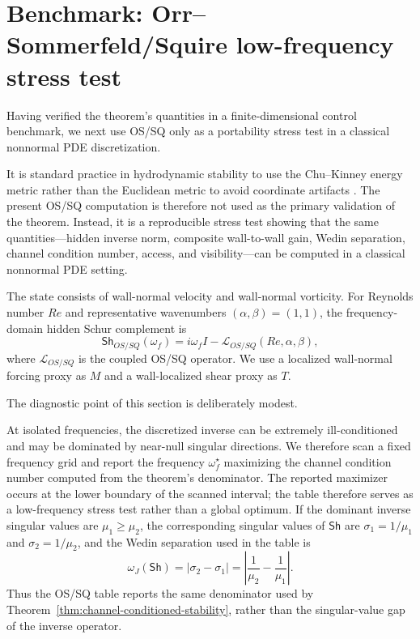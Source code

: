 \documentclass[review]{siamart220329}
\theoremstyle{definition}
\theoremstyle{remark}
\newcommand{\Sh}{\mathsf{Sh}}
\begin{document}
\section{Benchmark: Orr--Sommerfeld/Squire low-frequency stress test}\label{sec:orr-sommerfeld}

Having verified the theorem's quantities in a finite-dimensional control benchmark, we next use OS/SQ only as a portability stress test in a classical nonnormal PDE discretization.

It is standard practice in hydrodynamic stability to use the Chu--Kinney
energy metric rather than the Euclidean metric to avoid coordinate artifacts
\cite{SchmidHenningson2001}. The present OS/SQ computation is therefore not
used as the primary validation of the theorem. Instead, it is a reproducible
stress test showing that the same quantities---hidden inverse norm, composite
wall-to-wall gain, Wedin separation, channel condition number, access, and
visibility---can be computed in a classical nonnormal PDE setting.

The state consists of wall-normal velocity and wall-normal vorticity. For
Reynolds number $Re$ and representative wavenumbers $(\alpha,\beta)=(1,1)$, the
frequency-domain hidden Schur complement is
\begin{equation}
    \Sh_{OS/SQ}(\omega_f)=i\omega_f I-\mathcal L_{OS/SQ}(Re,\alpha,\beta),
    \label{eq:orr-sommerfeld-schur}
\end{equation}
where $\mathcal L_{OS/SQ}$ is the coupled OS/SQ operator. We use a localized
wall-normal forcing proxy as $M$ and a wall-localized shear proxy as $T$.

The diagnostic point of this section is deliberately modest.

At isolated
frequencies, the discretized inverse can be extremely ill-conditioned and may be
dominated by near-null singular directions. We therefore scan a fixed frequency
grid and report the frequency $\omega_f^\star$ maximizing the channel condition
number computed from the theorem's denominator. The reported maximizer occurs at the lower boundary of the scanned interval; the table therefore serves as a low-frequency stress test rather than a global optimum. If the dominant inverse singular
values are $\mu_1\geq\mu_2$, the corresponding singular values of $\Sh$ are
$\sigma_1=1/\mu_1$ and $\sigma_2=1/\mu_2$, and the Wedin separation used in the
table is
\begin{equation}
    \omega_J(\Sh)=|\sigma_2-\sigma_1|
    =\left|\frac{1}{\mu_2}-\frac{1}{\mu_1}\right|.
    \label{eq:os-wedin-gap}
\end{equation}
Thus the OS/SQ table reports the same denominator used by
Theorem~\ref{thm:channel-conditioned-stability}, rather than the
singular-value gap of the inverse operator.
\end{document}
